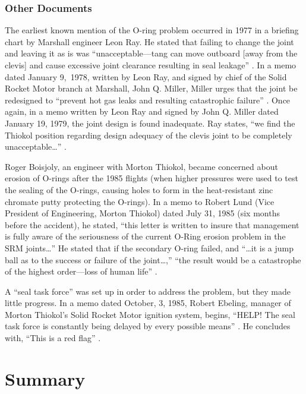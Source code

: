 \subsubsection{Other Documents}

The earliest known mention of the O-ring problem occurred in 1977 in a briefing chart by Marshall engineer Leon Ray. He stated that failing to change the joint and leaving it as is was ``unacceptable---tang can move outboard [away from the clevis] and cause excessive joint clearance resulting in seal leakage'' \cite[vol. 1, p. 233]{rogers}. In a memo dated January 9,~1978, written by Leon Ray, and signed by chief of the Solid Rocket Motor branch at Marshall, John Q. Miller, Miller urges that the joint be redesigned to ``prevent hot gas leaks and resulting catastrophic failure'' \cite[vol. 1, p. 234--235]{rogers}. Once again, in a memo written by Leon Ray and signed by John Q. Miller dated January 19, 1979, the joint design is found inadequate. Ray states, ``we find the Thiokol position regarding design adequacy of the clevis joint to be completely unacceptable\ldots'' \cite[vol. 1, p. 236]{rogers}.

Roger Boisjoly, an engineer with Morton Thiokol, became concerned about erosion of O-rings after the 1985 flights (when higher pressures were used to test the sealing of the O-rings, causing holes to form in the heat-resistant zinc chromate putty protecting the O-rings). In a memo to Robert Lund (Vice President of Engineering, Morton Thiokol) dated July 31, 1985 (six months before the accident), he stated, ``this letter is written to insure that management is fully aware of the seriousness of the current O-Ring erosion problem in the SRM joints\ldots'' He stated that if the secondary O-ring failed, and ``\ldots it is a jump ball as to the success or failure of the joint\ldots,'' ``the result would be a catastrophe of the highest order---loss of human life'' \cite[vol. 1, p. 249]{rogers}.

A ``seal task force'' was set up in order to address the problem, but they made little progress. In a memo dated October, 3, 1985, Robert Ebeling, manager of Morton Thiokol's Solid Rocket Motor ignition system, begins, ``HELP! The seal task force is constantly being delayed by every possible means'' \cite[vol. 1, p. 252]{rogers}. He concludes with, ``This is a red flag'' \cite[vol. 1, p. 252]{rogers}.

\section{Summary}

